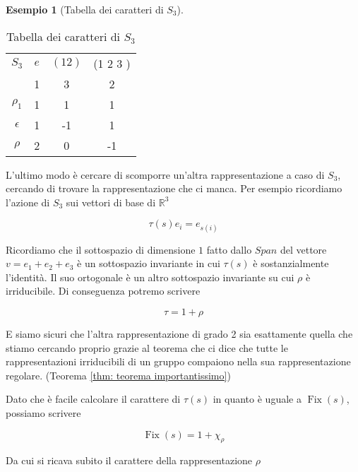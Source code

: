 \documentclass[11pt]{article}
\theoremstyle{plain}
\theoremstyle{definition}
\newtheorem{exmp}{Esempio}[section]
\theoremstyle{remark}
\DeclareMathOperator{\Fix}{Fix}
\begin{document}
\begin{exmp}[Tabella dei caratteri di $S_3$]
\begin{table}[!ht]
\centering
\begin{tabular}{|c|c|c|c|}
\hline
$S_3$  & $e$ & $(1 2)$ & (1 2 3 )    \\
 & 1 & 3 & 2 \\
\hline
 $\rho_1$ & 1 & 1  & 1 \\
\hline
$\epsilon$ & 1 & -1 & 1 \\
\hline
$\rho$ & 2 & 0 & -1 \\
\hline
\end{tabular}
\caption{Tabella dei caratteri di $S_3$}
\label{tabella caratteri s3}
\end{table}

L'ultimo modo è cercare di scomporre un'altra rappresentazione a caso di $S_3$, cercando di trovare la rappresentazione che ci manca. Per esempio ricordiamo l'azione di $S_3$ sui vettori di base di $\mathbb{R}^3$

\[ \tau(s) e_i = e_{s(i)}\]

Ricordiamo che il sottospazio di dimensione $1$ fatto dallo $Span$ del vettore $v = e_1 + e_2 + e_3$ è un sottospazio invariante in cui $\tau(s)$ è sostanzialmente l'identità. Il suo ortogonale è un altro sottospazio invariante su cui $\rho$ è irriducibile. Di conseguenza potremo scrivere

\[ \tau = 1 + \rho\]

E siamo sicuri che l'altra rappresentazione di grado 2 sia esattamente quella che stiamo cercando proprio grazie al teorema che ci dice che tutte le rappresentazioni irriducibili di un gruppo compaiono nella sua rappresentazione regolare. (Teorema \ref{thm: teorema importantissimo})

Dato che è facile calcolare il carattere di $\tau(s)$ in quanto è uguale a $\Fix(s)$, possiamo scrivere

\[ \Fix(s) = 1 + \chi_\rho\]

Da cui si ricava subito il carattere della rappresentazione $\rho$



\end{exmp}
\end{document}
